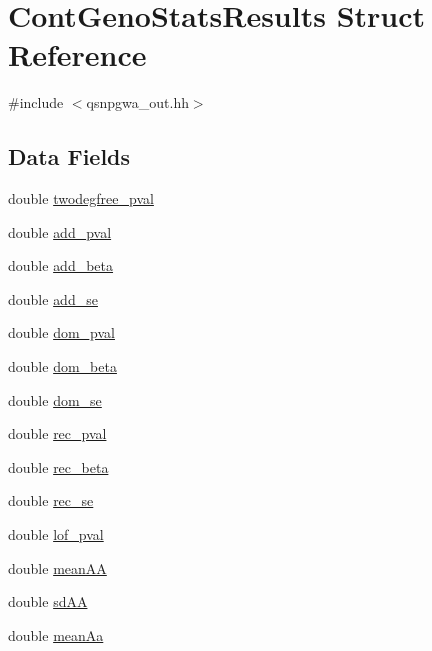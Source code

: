 \hypertarget{structContGenoStatsResults}{
\section{ContGenoStatsResults Struct Reference}
\label{structContGenoStatsResults}
}


{\ttfamily \#include $<$qsnpgwa\_\-out.hh$>$}

\subsection*{Data Fields}
\begin{DoxyCompactItemize}
\item 
double \hyperlink{structContGenoStatsResults_a46e49f7e50c6e79cb72a24541af776de}{twodegfree\_\-pval}
\item 
double \hyperlink{structContGenoStatsResults_a960ab4eed8207be8ab943568f605f9e7}{add\_\-pval}
\item 
double \hyperlink{structContGenoStatsResults_a5697e46b20d7aad7a060867a62035c80}{add\_\-beta}
\item 
double \hyperlink{structContGenoStatsResults_ac62b2d1651db400043c51155fbe3e053}{add\_\-se}
\item 
double \hyperlink{structContGenoStatsResults_a62c4556a520da61125c52298d2b6fe14}{dom\_\-pval}
\item 
double \hyperlink{structContGenoStatsResults_a729b7ddee22418b46cd1952c1b39b204}{dom\_\-beta}
\item 
double \hyperlink{structContGenoStatsResults_a231a8457407e3c60a08542f5adb24186}{dom\_\-se}
\item 
double \hyperlink{structContGenoStatsResults_a6dea2a65a913691d67428a5bc7426a1b}{rec\_\-pval}
\item 
double \hyperlink{structContGenoStatsResults_a909674df22f15d550d6197074ce0412e}{rec\_\-beta}
\item 
double \hyperlink{structContGenoStatsResults_ae0b4b272bf7f6c40ab1cabd25fd84230}{rec\_\-se}
\item 
double \hyperlink{structContGenoStatsResults_a71916d32fe1bde64287e62116f87f8dd}{lof\_\-pval}
\item 
double \hyperlink{structContGenoStatsResults_a8c6a8778e17ebf6a14fdaf62a232d158}{meanAA}
\item 
double \hyperlink{structContGenoStatsResults_a17738d1319ce925127a86b45d321b58b}{sdAA}
\item 
double \hyperlink{structContGenoStatsResults_a190aa494b76da01c66207d8c3f2dd9f0}{meanAa}

\end{DoxyCompactItemize}
